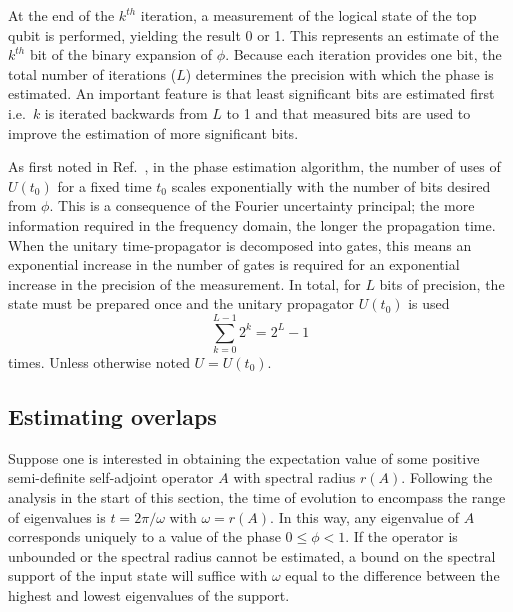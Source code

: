 \documentclass[11pt,oneside,final]{huthesis}%
\begin{document}
At the end of the $k^{th}$ iteration, a measurement of the logical state of the top qubit is 
performed, yielding the result 0 or 1. This represents an estimate of the $k^{{th}}$ bit of 
the binary expansion of $\phi$. Because each iteration provides one bit, the 
total number of iterations ($L$) determines the precision with which the phase is estimated. An 
important feature is that least significant bits are estimated first i.e.~$k$ is iterated backwards 
from $L$ to 1 and that measured bits are used to improve the estimation of more significant bits. 


As first noted in Ref.~\cite{Brown06}, in the phase estimation algorithm, the number of uses of $U(t_0)$ for a fixed time $t_0$ scales exponentially with the number of bits desired from $\phi$.   This is a consequence of the Fourier uncertainty principal; the more information required in the frequency domain, the longer the propagation time.  When the unitary time-propagator is decomposed into gates, this means an exponential increase in the number of gates is required for an exponential increase in the precision of the measurement.  In total, for $L$ bits of precision, the state must be prepared once and the unitary propagator $U(t_0)$ is used $$\sum_{k=0}^{L-1}2^k=2^{L}-1$$  times. Unless otherwise noted $U=U(t_0)$.

\subsection{Estimating overlaps}\label{sec:overlaps}

Suppose one is interested in obtaining the expectation value of some positive semi-definite self-adjoint operator $A$ with spectral radius $r(A)$. Following the analysis in the start of this section, the time of evolution to encompass the range of eigenvalues is $t=2\pi/\omega$ with $\omega=r(A)$.  In this way, any eigenvalue of $A$ corresponds uniquely to a value of the phase $0\leq\phi<1$.  If the operator is unbounded or the spectral radius cannot be estimated, a bound on the spectral support of the input state will suffice with $\omega$ equal to the difference between the highest and lowest eigenvalues of the support.
\end{document}
